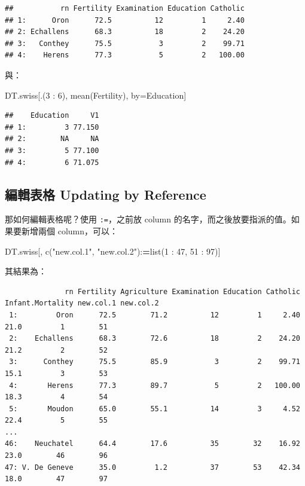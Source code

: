 \documentclass[
]{book}
\newenvironment{Shaded}{\begin{snugshade}}{\end{snugshade}}
\newcommand{\DecValTok}[1]{\textcolor[rgb]{0.00,0.00,0.81}{#1}}
\newcommand{\ErrorTok}[1]{\textcolor[rgb]{0.64,0.00,0.00}{\textbf{#1}}}
\newcommand{\FunctionTok}[1]{\textcolor[rgb]{0.00,0.00,0.00}{#1}}
\newcommand{\NormalTok}[1]{#1}
\newcommand{\OtherTok}[1]{\textcolor[rgb]{0.56,0.35,0.01}{#1}}
\newcommand{\SpecialCharTok}[1]{\textcolor[rgb]{0.00,0.00,0.00}{#1}}
\newcommand{\StringTok}[1]{\textcolor[rgb]{0.31,0.60,0.02}{#1}}
\theoremstyle{definition}
\theoremstyle{remark}
\begin{document}
\begin{verbatim}
##           rn Fertility Examination Education Catholic
## 1:      Oron      72.5          12         1     2.40
## 2: Echallens      68.3          18         2    24.20
## 3:   Conthey      75.5           3         2    99.71
## 4:    Herens      77.3           5         2   100.00
\end{verbatim}

與：

\begin{Shaded}
\begin{Highlighting}[]
\NormalTok{DT.swiss[.(}\DecValTok{3} \SpecialCharTok{:} \DecValTok{6}\NormalTok{), }\FunctionTok{mean}\NormalTok{(Fertility), by}\OtherTok{=}\NormalTok{Education]}
\end{Highlighting}
\end{Shaded}

\begin{verbatim}
##    Education     V1
## 1:         3 77.150
## 2:        NA     NA
## 3:         5 77.100
## 4:         6 71.075
\end{verbatim}

\hypertarget{ux7de8ux8f2fux8868ux683c-updating-by-reference}{%
\subsection{編輯表格 Updating by Reference}\label{ux7de8ux8f2fux8868ux683c-updating-by-reference}}

那如何編輯表格呢？使用 \texttt{:=}，之前放 column 的名字，而之後放要指派的值。如果要新增兩個 column，可以：

\begin{Shaded}
\begin{Highlighting}[]
\NormalTok{DT.swiss[, }\FunctionTok{c}\NormalTok{(}\StringTok{"new.col.1"}\NormalTok{, }\StringTok{"new.col.2"}\NormalTok{)}\SpecialCharTok{:}\ErrorTok{=}\FunctionTok{list}\NormalTok{(}\DecValTok{1} \SpecialCharTok{:} \DecValTok{47}\NormalTok{, }\DecValTok{51} \SpecialCharTok{:} \DecValTok{97}\NormalTok{)]}
\end{Highlighting}
\end{Shaded}

其結果為：

\begin{verbatim}
              rn Fertility Agriculture Examination Education Catholic Infant.Mortality new.col.1 new.col.2
 1:         Oron      72.5        71.2          12         1     2.40             21.0         1        51
 2:    Echallens      68.3        72.6          18         2    24.20             21.2         2        52
 3:      Conthey      75.5        85.9           3         2    99.71             15.1         3        53
 4:       Herens      77.3        89.7           5         2   100.00             18.3         4        54
 5:       Moudon      65.0        55.1          14         3     4.52             22.4         5        55
...
46:    Neuchatel      64.4        17.6          35        32    16.92             23.0        46        96
47: V. De Geneve      35.0         1.2          37        53    42.34             18.0        47        97
\end{verbatim}
\end{document}
